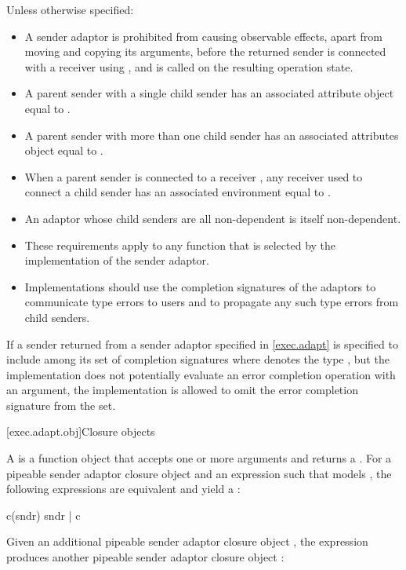 \pnum
Unless otherwise specified:
\begin{itemize}
\item
A sender adaptor is prohibited from causing observable effects,
apart from moving and copying its arguments,
before the returned sender is connected with a receiver using ,
and  is called on the resulting operation state.
\item
A parent sender with a single child sender  has
an associated attribute object equal to
.
\item
A parent sender with more than one child sender has
an associated attributes object equal to .
\item
When a parent sender is connected to a receiver ,
any receiver used to connect a child sender has
an associated environment equal to .
\item
An adaptor whose child senders are all non-dependent
is itself non-dependent.
\item
These requirements apply to any function
that is selected by the implementation of the sender adaptor.
\item
 \recommended
Implementations should use
the completion signatures of the adaptors
to communicate type errors to users and
to propagate any such type errors from child senders.
\end{itemize}

\pnum
If a sender returned from a sender adaptor specified in \ref{exec.adapt}
is specified to include 
among its set of completion signatures
where  denotes the type ,
but the implementation does not potentially evaluate
an error completion operation with an  argument,
the implementation is allowed to omit
the  error completion signature from the set.

[exec.adapt.obj]{Closure objects}

%
\pnum
A  is a function object
that accepts one or more  arguments and returns a .
For a pipeable sender adaptor closure object  and
an expression 
such that  models ,
the following expressions are equivalent and yield a :
\begin{codeblock}
c(sndr)
sndr | c
\end{codeblock}
Given an additional pipeable sender adaptor closure object ,
the expression  produces
another pipeable sender adaptor closure object :

